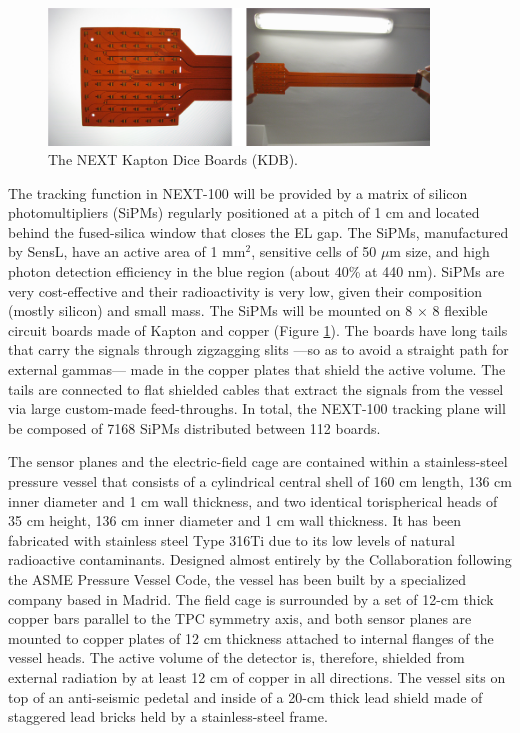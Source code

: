 \begin{figure}
\centering
\includegraphics[width=0.9\textwidth]{img2/KDB.png}
\caption{\small The NEXT Kapton Dice Boards (KDB).} \label{fig.KDB}
\end{figure} 

The tracking function in NEXT-100 will be provided by a matrix of silicon photomultipliers (SiPMs) regularly positioned at a pitch of 1 cm and located behind the fused-silica window that closes the EL gap. The SiPMs, manufactured by SensL, have an active area of 1 mm$^2$, sensitive cells of 50 $\mu$m size, and high photon detection efficiency in the blue region (about 40\% at 440 nm). SiPMs are very cost-effective and their radioactivity is very low, given their composition (mostly silicon) and small mass. The SiPMs will be mounted on 8 × 8 flexible circuit boards made of Kapton and copper (Figure \ref{fig.KDB}). The boards have long tails that carry the signals through zigzagging slits ---so as to avoid a straight path for external gammas--- made in the copper plates that shield the active volume. The tails are connected to flat shielded cables that extract the signals from the vessel via large custom-made feed-throughs. In total, the NEXT-100 tracking plane will be composed of 7168 SiPMs distributed between 112 boards.

The sensor planes and the electric-field cage are contained within a stainless-steel pressure vessel that consists of a cylindrical central shell of 160 cm length, 136 cm inner diameter and 1 cm wall thickness, and two identical torispherical heads of 35 cm height, 136 cm inner diameter and 1 cm wall thickness. It has been fabricated with stainless steel Type 316Ti due to its low levels of natural radioactive contaminants. Designed almost entirely by the Collaboration following the ASME Pressure Vessel Code, the vessel has been built by a specialized company based in Madrid. The field cage is surrounded by a set of 12-cm thick copper bars parallel to the TPC symmetry axis, and both sensor planes are mounted to copper plates of 12 cm thickness attached to internal flanges of the vessel heads. The active volume of the detector is, therefore, shielded from external radiation by at least 12 cm of copper in all directions. The vessel sits on top of an anti-seismic pedetal and inside of a 20-cm thick lead shield made of staggered lead bricks held by a stainless-steel frame.
